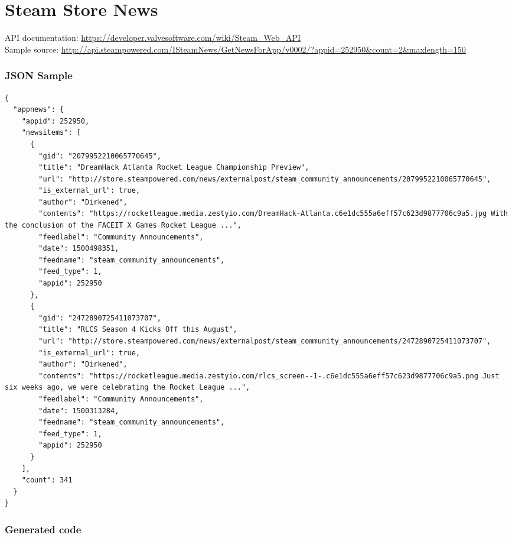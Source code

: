 \section{Steam Store News}
\label{app:steamnews}

API documentation: \url{https://developer.valvesoftware.com/wiki/Steam_Web_API} \\
Sample source: \url{http://api.steampowered.com/ISteamNews/GetNewsForApp/v0002/?appid=252950&count=2&maxlength=150}

\subsubsection{JSON Sample}

\begin{multicols}{2}
\begin{verbatim}
{
  "appnews": {
    "appid": 252950,
    "newsitems": [
      {
        "gid": "2079952210065770645",
        "title": "DreamHack Atlanta Rocket League Championship Preview",
        "url": "http://store.steampowered.com/news/externalpost/steam_community_announcements/2079952210065770645",
        "is_external_url": true,
        "author": "Dirkened",
        "contents": "https://rocketleague.media.zestyio.com/DreamHack-Atlanta.c6e1dc555a6eff57c623d9877706c9a5.jpg With the conclusion of the FACEIT X Games Rocket League ...",
        "feedlabel": "Community Announcements",
        "date": 1500498351,
        "feedname": "steam_community_announcements",
        "feed_type": 1,
        "appid": 252950
      },
      {
        "gid": "2472890725411073707",
        "title": "RLCS Season 4 Kicks Off this August",
        "url": "http://store.steampowered.com/news/externalpost/steam_community_announcements/2472890725411073707",
        "is_external_url": true,
        "author": "Dirkened",
        "contents": "https://rocketleague.media.zestyio.com/rlcs_screen--1-.c6e1dc555a6eff57c623d9877706c9a5.png Just six weeks ago, we were celebrating the Rocket League ...",
        "feedlabel": "Community Announcements",
        "date": 1500313284,
        "feedname": "steam_community_announcements",
        "feed_type": 1,
        "appid": 252950
      }
    ],
    "count": 341
  }
}
\end{verbatim}
\end{multicols}

\subsubsection{Generated code}

